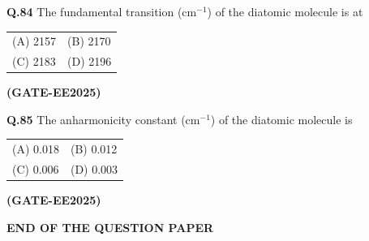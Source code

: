 \documentclass[12pt]{article}
\begin{document}
\begin{enumerate}
\textbf{Q.84} \quad The fundamental transition (cm$^{-1}$) of the diatomic molecule is at

\begin{tabular}{ll}
(A) 2157 & (B) 2170 \\
(C) 2183 & (D) 2196 \\
\end{tabular}   \textbf{(GATE-EE2025)}


\textbf{Q.85} \quad The anharmonicity constant (cm$^{-1}$) of the diatomic molecule is

\begin{tabular}{ll}
(A) 0.018 & (B) 0.012 \\
(C) 0.006 & (D) 0.003 \\
\end{tabular}   \textbf{(GATE-EE2025)}


\begin{center}
\textbf{END OF THE QUESTION PAPER}
\end{center}

\end{enumerate}
\end{document}
